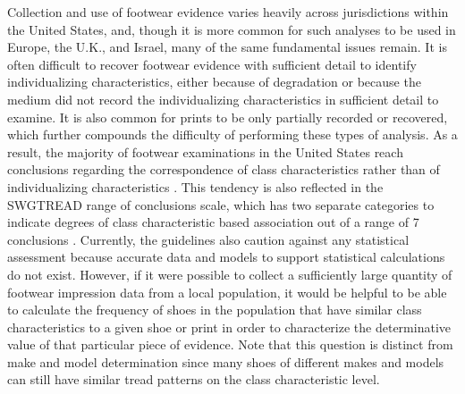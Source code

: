 \documentclass{article}\usepackage[]{graphicx}\usepackage[table]{xcolor}
\begin{document}
Collection and use of footwear evidence varies heavily across jurisdictions within the United States, and, though it is more common for such analyses to be used in Europe, the U.K., and Israel, many of the same fundamental issues remain. It is often difficult to recover footwear evidence with sufficient detail to identify individualizing characteristics, either because of degradation or because the medium did not record the individualizing characteristics in sufficient detail to examine. It is also common for prints to be only partially recorded or recovered, which further compounds the difficulty of performing these types of analysis. As a result, the majority of footwear examinations in the United States reach conclusions regarding the correspondence of class characteristics rather than of individualizing characteristics \citep{smith_2011}. This tendency is also reflected in the SWGTREAD range of conclusions scale, which has two separate categories to indicate degrees of class characteristic based association out of a range of 7 conclusions \citep{SWGTREAD2013}. Currently, the guidelines also caution against any statistical assessment because accurate data and models to support statistical calculations do not exist. However, if it were possible to collect a sufficiently large quantity of footwear impression data from a local population, it would be helpful to be able to calculate the frequency of shoes in the population that have similar class characteristics to a given shoe or print in order to characterize the determinative value of that particular piece of evidence. Note that this question is distinct from make and model determination since many shoes of different makes and models can still have similar tread patterns on the class characteristic level.
\end{document}
